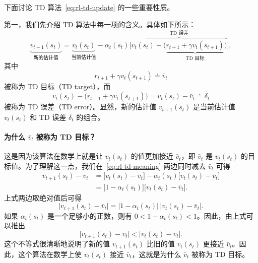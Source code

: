 下面讨论 TD 算法~\eqref{eq:rl-td-update} 的一些重要性质。

第一，我们先介绍 TD 算法中每一项的含义。具体如下所示：
\begin{equation}
  \underbrace{v_{t+1}(s_t)}_{\text{新的估计值}} = \underbrace{v_t(s_t)}_{\text{当前估计值}} - \alpha_t(s_t) \big[ \overbrace{v_t(s_t) - \big( \underbrace{r_{t+1} + \gamma v_t(s_{t+1})}_{\text{TD 目标}} \big)}^{\text{TD 误差}} \big],
  \label{eq:rl-td-meaning}
\end{equation}
其中
\[
  r_{t+1} + \gamma v_t(s_{t+1}) \doteq \bar{v}_t
\]
被称为 TD 目标（TD target），而
\[
  v_t(s_t) - \big( r_{t+1} + \gamma v_t(s_{t+1}) \big) = v_t(s_t) - \bar{v}_t \doteq \delta_t
\]
被称为 TD 误差（TD error）。显然，新的估计值 $v_{t+1}(s_t)$ 是当前估计值 $v_t(s_t)$ 和 TD 误差 $\delta_t$ 的组合。

\paragraph{为什么 $\bar{v}_t$ 被称为 TD 目标？}
这是因为该算法在数学上就是让 $v_t(s_t)$ 的值更加接近 $\bar{v}_t$，即 $\bar{v}_t$ 是 $v_t(s_t)$ 的目标值。为了理解这一点，我们在~\eqref{eq:rl-td-meaning} 两边同时减去 $\bar{v}_t$ 可得
\begin{align*}
  v_{t+1}(s_t) - \bar{v}_t &= \big[ v_t(s_t) - \bar{v}_t \big] - \alpha_t(s_t) \big[ v_t(s_t) - \bar{v}_t \big] \\
  &= \big[ 1 - \alpha_t(s_t) \big] \big[ v_t(s_t) - \bar{v}_t \big].
\end{align*}
上式两边取绝对值后可得
\[
  \big| v_{t+1}(s_t) - \bar{v}_t \big| = \big| 1 - \alpha_t(s_t) \big| \, \big| v_t(s_t) - \bar{v}_t \big|.
\]
如果 $\alpha_t(s_t)$ 是一个足够小的正数，则有 $0 < 1 - \alpha_t(s_t) < 1$。因此，由上式可以推出
\[
  \big| v_{t+1}(s_t) - \bar{v}_t \big| < \big| v_t(s_t) - \bar{v}_t \big|.
\]
这个不等式很清晰地说明了新的值 $v_{t+1}(s_t)$ 比旧的值 $v_t(s_t)$ 更接近 $\bar{v}_t$。因此，这个算法在数学上使 $v_t(s_t)$ 接近 $\bar{v}_t$，这就是为什么 $\bar{v}_t$ 被称为 TD 目标。

